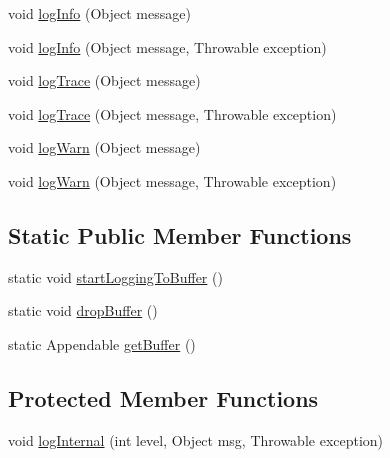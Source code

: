 \begin{DoxyCompactItemize}
\item 
void \mbox{\hyperlink{classcom_1_1mysql_1_1cj_1_1log_1_1_standard_logger_aeeb1226e65e7183722939e8ae666a910}{log\+Info}} (Object message)
\item 
void \mbox{\hyperlink{classcom_1_1mysql_1_1cj_1_1log_1_1_standard_logger_a9086549846486165e052a7e1ce190864}{log\+Info}} (Object message, Throwable exception)
\item 
void \mbox{\hyperlink{classcom_1_1mysql_1_1cj_1_1log_1_1_standard_logger_a31c4a397719a30877e689fcba2e1054a}{log\+Trace}} (Object message)
\item 
void \mbox{\hyperlink{classcom_1_1mysql_1_1cj_1_1log_1_1_standard_logger_ae77a38e81b2d0ecb1ccbeafee9294bd3}{log\+Trace}} (Object message, Throwable exception)
\item 
void \mbox{\hyperlink{classcom_1_1mysql_1_1cj_1_1log_1_1_standard_logger_a5197952ca4b6dfe59a54c1aa095717f7}{log\+Warn}} (Object message)
\item 
void \mbox{\hyperlink{classcom_1_1mysql_1_1cj_1_1log_1_1_standard_logger_a3e05a95a97a95afb400144f652f43c78}{log\+Warn}} (Object message, Throwable exception)
\end{DoxyCompactItemize}
\subsection*{Static Public Member Functions}
\begin{DoxyCompactItemize}
\item 
static void \mbox{\hyperlink{classcom_1_1mysql_1_1cj_1_1log_1_1_standard_logger_a831ea7f31d1a979788a0018a1926bc7f}{start\+Logging\+To\+Buffer}} ()
\item 
static void \mbox{\hyperlink{classcom_1_1mysql_1_1cj_1_1log_1_1_standard_logger_a1f123fa8069f24fb6a6dadc637ed72d2}{drop\+Buffer}} ()
\item 
static Appendable \mbox{\hyperlink{classcom_1_1mysql_1_1cj_1_1log_1_1_standard_logger_a00cead61d34309cd88c4bbc4263e6ced}{get\+Buffer}} ()
\end{DoxyCompactItemize}
\subsection*{Protected Member Functions}
\begin{DoxyCompactItemize}
\item 
void \mbox{\hyperlink{classcom_1_1mysql_1_1cj_1_1log_1_1_standard_logger_afcee91b3229c2c03530120c1a7842342}{log\+Internal}} (int level, Object msg, Throwable exception)
\end{DoxyCompactItemize}
